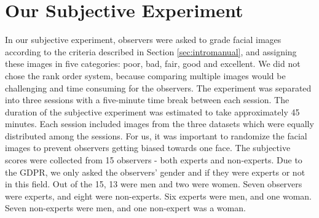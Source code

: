 \begin{table}[h]
\caption{Information about all datasets used in the project.}
\label{table:DatasetInformation}
\end{table}

\section{Our Subjective Experiment}
\label{sec:OurSubjectiveExperiment}
In our subjective experiment, observers were asked to grade facial images according to the criteria described in Section \ref{sec:intromanual}, and assigning these images in five categories: poor, bad, fair, good and excellent. We did not chose the rank order system, because comparing multiple images would be challenging and time consuming for the observers. The experiment was separated into three sessions with a five-minute time break between each session. The duration of the subjective experiment was estimated to take approximately 45 minutes. Each session included images from the three datasets which were equally distributed among the sessions. For us, it was important to randomize the facial images to prevent observers getting biased towards one face. The subjective scores were collected from 15 observers - both experts and non-experts. Due to the GDPR, we only asked the observers' gender and if they were experts or not in this field. Out of the 15, 13 were men and two were women. Seven observers were experts, and eight were non-experts. Six experts were men, and one woman. Seven non-experts were men, and one non-expert was a woman. 
%
